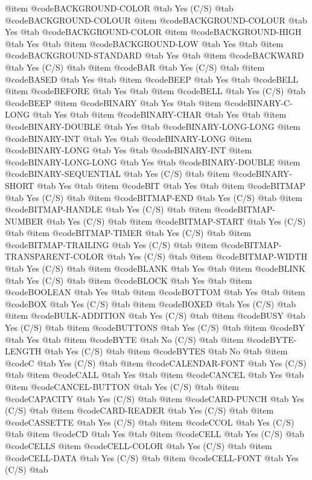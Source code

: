 @item @code{BACKGROUND-COLOR} @tab Yes	(C/S) @tab @code{BACKGROUND-COLOUR}
@item @code{BACKGROUND-COLOUR} @tab Yes @tab @code{BACKGROUND-COLOR}
@item @code{BACKGROUND-HIGH} @tab Yes @tab 
@item @code{BACKGROUND-LOW} @tab Yes @tab 
@item @code{BACKGROUND-STANDARD} @tab Yes @tab 
@item @code{BACKWARD} @tab Yes	(C/S) @tab 
@item @code{BAR} @tab Yes	(C/S) @tab 
@item @code{BASED} @tab Yes @tab 
@item @code{BEEP} @tab Yes @tab @code{BELL}
@item @code{BEFORE} @tab Yes @tab 
@item @code{BELL} @tab Yes	(C/S) @tab @code{BEEP}
@item @code{BINARY} @tab Yes @tab 
@item @code{BINARY-C-LONG} @tab Yes @tab 
@item @code{BINARY-CHAR} @tab Yes @tab 
@item @code{BINARY-DOUBLE} @tab Yes @tab @code{BINARY-LONG-LONG}
@item @code{BINARY-INT} @tab Yes @tab @code{BINARY-LONG}
@item @code{BINARY-LONG} @tab Yes @tab @code{BINARY-INT}
@item @code{BINARY-LONG-LONG} @tab Yes @tab @code{BINARY-DOUBLE}
@item @code{BINARY-SEQUENTIAL} @tab Yes	(C/S) @tab 
@item @code{BINARY-SHORT} @tab Yes @tab 
@item @code{BIT} @tab Yes @tab 
@item @code{BITMAP} @tab Yes	(C/S) @tab 
@item @code{BITMAP-END} @tab Yes	(C/S) @tab 
@item @code{BITMAP-HANDLE} @tab Yes	(C/S) @tab 
@item @code{BITMAP-NUMBER} @tab Yes	(C/S) @tab 
@item @code{BITMAP-START} @tab Yes	(C/S) @tab 
@item @code{BITMAP-TIMER} @tab Yes	(C/S) @tab 
@item @code{BITMAP-TRAILING} @tab Yes	(C/S) @tab 
@item @code{BITMAP-TRANSPARENT-COLOR} @tab Yes	(C/S) @tab 
@item @code{BITMAP-WIDTH} @tab Yes	(C/S) @tab 
@item @code{BLANK} @tab Yes @tab 
@item @code{BLINK} @tab Yes	(C/S) @tab 
@item @code{BLOCK} @tab Yes @tab 
@item @code{BOOLEAN} @tab Yes @tab 
@item @code{BOTTOM} @tab Yes @tab 
@item @code{BOX} @tab Yes	(C/S) @tab 
@item @code{BOXED} @tab Yes	(C/S) @tab 
@item @code{BULK-ADDITION} @tab Yes	(C/S) @tab 
@item @code{BUSY} @tab Yes	(C/S) @tab 
@item @code{BUTTONS} @tab Yes	(C/S) @tab 
@item @code{BY} @tab Yes @tab 
@item @code{BYTE} @tab No	(C/S) @tab 
@item @code{BYTE-LENGTH} @tab Yes	(C/S) @tab 
@item @code{BYTES} @tab No @tab 
@item @code{C} @tab Yes	(C/S) @tab 
@item @code{CALENDAR-FONT} @tab Yes	(C/S) @tab 
@item @code{CALL} @tab Yes @tab 
@item @code{CANCEL} @tab Yes @tab 
@item @code{CANCEL-BUTTON} @tab Yes	(C/S) @tab 
@item @code{CAPACITY} @tab Yes	(C/S) @tab 
@item @code{CARD-PUNCH} @tab Yes	(C/S) @tab 
@item @code{CARD-READER} @tab Yes	(C/S) @tab 
@item @code{CASSETTE} @tab Yes	(C/S) @tab 
@item @code{CCOL} @tab Yes	(C/S) @tab 
@item @code{CD} @tab Yes @tab 
@item @code{CELL} @tab Yes	(C/S) @tab @code{CELLS}
@item @code{CELL-COLOR} @tab Yes	(C/S) @tab 
@item @code{CELL-DATA} @tab Yes	(C/S) @tab 
@item @code{CELL-FONT} @tab Yes	(C/S) @tab 
